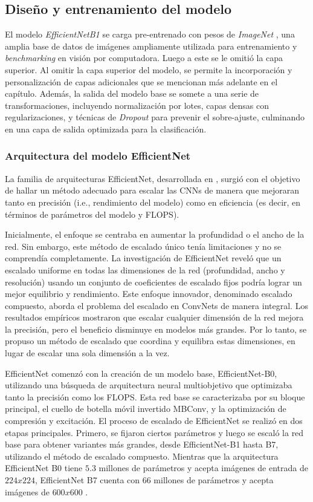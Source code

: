 \subsection{Diseño y entrenamiento del modelo}

El modelo \textit{EfficientNetB1} se carga pre-entrenado con pesos de \textit{ImageNet} , una amplia base de datos de imágenes ampliamente utilizada para entrenamiento y \textit{benchmarking} en visión por computadora. Luego a este se le omitió la capa superior. Al omitir la capa superior del modelo, se permite la incorporación y personalización de capas adicionales que se mencionan más adelante en el capítulo. Además, la salida del modelo base se somete a una serie de transformaciones, incluyendo normalización por lotes, capas densas con regularizaciones, y técnicas de \textit{Dropout} para prevenir el sobre-ajuste, culminando en una capa de salida optimizada para la clasificación.

\subsubsection{Arquitectura del modelo EfficientNet}
   
La familia de arquitecturas EfficientNet, desarrollada en , surgió con el objetivo de hallar un método adecuado para escalar las CNNs de manera que mejoraran tanto en precisión (i.e., rendimiento del modelo) como en eficiencia (es decir, en términos de parámetros del modelo y FLOPS). 

Inicialmente, el enfoque se centraba en aumentar la profundidad o el ancho de la red. Sin embargo, este método de escalado único tenía limitaciones y no se comprendía completamente. La investigación de EfficientNet reveló que un escalado uniforme en todas las dimensiones de la red (profundidad, ancho y resolución) usando un conjunto de coeficientes de escalado fijos podría lograr un mejor equilibrio y rendimiento. Este enfoque innovador, denominado escalado compuesto, aborda el problema del escalado en ConvNets de manera integral. Los resultados empíricos mostraron que escalar cualquier dimensión de la red mejora la precisión, pero el beneficio disminuye en modelos más grandes. Por lo tanto, se propuso un método de escalado que coordina y equilibra estas dimensiones, en lugar de escalar una sola dimensión a la vez.

EfficientNet comenzó con la creación de un modelo base, EfficientNet-B0, utilizando una búsqueda de arquitectura neural multiobjetivo que optimizaba tanto la precisión como los FLOPS. Esta red base se caracterizaba por su bloque principal, el cuello de botella móvil invertido MBConv, y la optimización de compresión y excitación. El proceso de escalado de EfficientNet se realizó en dos etapas principales. Primero, se fijaron ciertos parámetros y luego se escaló la red base para obtener variantes más grandes, desde EfficientNet-B1 hasta B7, utilizando el método de escalado compuesto. Mientras que la arquitectura EfficientNet B0 tiene $5.3$ millones de parámetros y acepta imágenes de entrada de $224x224$, EfficientNet B7 cuenta con $66$ millones de parámetros y acepta imágenes de $600x600$ .
  
